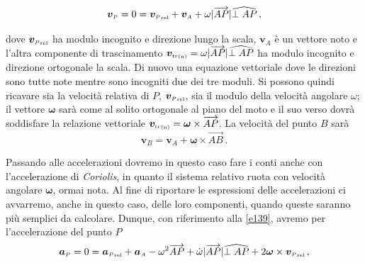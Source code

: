\begin{equation}
{{\bm v}_{\scriptscriptstyle{P}}}=0= 
{{\bm v}_{\scriptscriptstyle{P}}}_{\scriptscriptstyle{{\rm rel}}}+ 
{{\bm v}_{\scriptscriptstyle{A}}}+
{\omega}|\overrightarrow{AP}|\widehat{{\perp{AP}}}\,,
\label{e148}
\end{equation}

\noindent dove 
${{\bm v}_{\scriptscriptstyle{P}}}_{\scriptscriptstyle{{\rm rel}}}$ ha modulo incognito e direzione lungo la scala,
${{\bm v}_{\scriptscriptstyle{A}}}$ \`e un vettore noto e l'altra componente di trascinamento
${{\bm v}_{\scriptscriptstyle{{\rm tr}}}}_{\scriptscriptstyle{{\rm (n)}}}=
{\omega}|\overrightarrow{AP}|\widehat{{\perp{AP}}}$
ha modulo incognito e direzione ortogonale la scala.
Di nuovo una equazione vettoriale dove le direzioni sono tutte note mentre sono incogniti due dei tre moduli. Si possono quindi ricavare sia la velocit\`a relativa di $P$,
${{\bm v}_{\scriptscriptstyle{P}}}_{\scriptscriptstyle{{\rm rel}}}$, sia il
modulo della velocit\`a angolare
$\omega$; il vettore $\bm \omega$ sar\`a come al solito ortogonale
al piano del moto e il suo verso dovr\`a soddisfare la relazione vettoriale
${{\bm v}_{\scriptscriptstyle{{\rm tr}}}}_{\scriptscriptstyle{{\rm (n)}}}=
{\bm\omega}\times\overrightarrow{AP}$.
La velocit\`a del punto
$B$ sar\`a 
\begin{equation}
{{\bm v}_{\scriptscriptstyle{B}}}= 
{{\bm v}_{\scriptscriptstyle{A}}}+
\bm\omega\times\overrightarrow{AB}\,.
\label{e149}
\end{equation}

\noindent Passando alle accelerazioni dovremo in questo caso fare i conti anche con l'accelerazione di {\em Coriolis}, in quanto il sistema relativo ruota con
velocit\`a angolare $\bm\omega$, ormai nota. Al fine di riportare
le espressioni delle accelerazioni ci avvarremo, anche in questo caso,
delle loro componenti, quando queste saranno pi\`u semplici da calcolare.
Dunque, con riferimento alla \ref{e139},
avremo per l'accelerazione del punto $P$
\begin{equation}
{{\bm a}_{\scriptscriptstyle{P}}}=0= 
{{\bm a}_{\scriptscriptstyle{P}}}_{\scriptscriptstyle{{\rm rel}}}+ 
{{\bm a}_{\scriptscriptstyle{A}}}
-\omega^2 \overrightarrow{AP} + \dot{\omega}|\overrightarrow{AP}|\widehat{{\perp{AP}}}+
2{\bm \omega}\times
{{\bm v}_{\scriptscriptstyle{P}}}_{\scriptscriptstyle{{\rm rel}}}\,,
\label{e150}
\end{equation}

